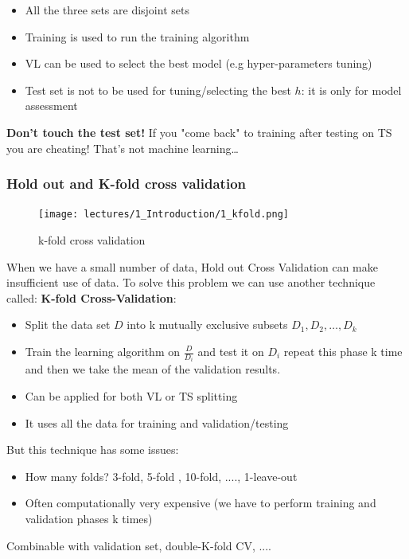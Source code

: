 \documentclass[../main.tex]{subfiles}
\begin{document}
\begin{itemize}
    \item All the three sets are disjoint sets
    \item Training is used to run the training algorithm
    \item VL can be used to select the best model (e.g hyper-parameters tuning)
    \item Test set is not to be used for tuning/selecting the best $h$: it is only for model assessment
\end{itemize}

\textbf{Don't touch the test set!} If you "come back" to training after testing on TS you are cheating! That's not machine learning\ldots

\subsubsection{Hold out and K-fold cross validation}
\begin{figure}
    \centering
    \texttt{[image: lectures/1\_Introduction/1\_kfold.png]}
    \caption{k-fold cross validation}
    \label{fig:1_kfold}
\end{figure}
When we have a small number of data, Hold out Cross Validation can make insufficient use of data. To solve this problem we can use another technique called: \textbf{K-fold Cross-Validation}:

\begin{itemize}
    \item Split the data set $D$ into k mutually exclusive subsets $D_1,D_2,\dots,D_k$
    \item Train the learning algorithm on $\frac{D}{D_{i}}$ and test it on $D_i$ repeat this phase k time and then we take the mean of the validation results.
    \item Can be applied for both VL or TS splitting
    \item It uses all the data for training and validation/testing
\end{itemize}

But this technique has some issues: 
\begin{itemize}
    \item How many folds? 3-fold, 5-fold , 10-fold, ...., 1-leave-out
    \item Often computationally very expensive (we have to perform training and validation phases k times)
\end{itemize}

Combinable with validation set, double-K-fold CV, ....
\end{document}
